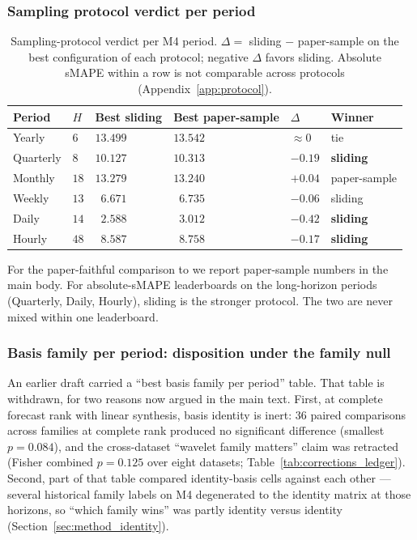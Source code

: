 \subsubsection{Sampling protocol verdict per period}
\label{app:hyperparams:sampling}

\begin{table}[h]
\centering
\small
\caption{Sampling-protocol verdict per M4 period. $\Delta =$ sliding
$-$ paper-sample on the best configuration of each protocol; negative
$\Delta$ favors sliding. Absolute sMAPE within a row is not comparable
across protocols (Appendix~\ref{app:protocol}).}
\label{tab:protocol_per_period}
\begin{tabular}{@{}llllll@{}}
\toprule
Period & $H$ & Best sliding & Best paper-sample & $\Delta$ & Winner \\
\midrule
Yearly    & $6$  & $13.499$ & $13.542$ & $\approx 0$ & tie \\
Quarterly & $8$  & $10.127$ & $10.313$ & $-0.19$ & \textbf{sliding} \\
Monthly   & $18$ & $13.279$ & $13.240$ & $+0.04$ & paper-sample \\
Weekly    & $13$ & $\phantom{0}6.671$ & $\phantom{0}6.735$ & $-0.06$ & sliding \\
Daily     & $14$ & $\phantom{0}2.588$ & $\phantom{0}3.012$ & $\mathbf{-0.42}$ & \textbf{sliding} \\
Hourly    & $48$ & $\phantom{0}8.587$ & $\phantom{0}8.758$ & $-0.17$ & \textbf{sliding} \\
\bottomrule
\end{tabular}
\end{table}

For the paper-faithful comparison to \citet{oreshkin2020nbeats} we report
paper-sample numbers in the main body. For absolute-sMAPE leaderboards on
the long-horizon periods (Quarterly, Daily, Hourly), sliding is the
stronger protocol. The two are never mixed within one leaderboard.

\subsubsection{Basis family per period: disposition under the family null}
\label{app:hyperparams:basisfamily}

An earlier draft carried a ``best basis family per period'' table. That
table is withdrawn, for two reasons now argued in the main text. First, at
complete forecast rank with linear synthesis, basis identity is inert:
36 paired comparisons across families at complete rank produced no
significant difference (smallest $p = 0.084$), and the cross-dataset
``wavelet family matters'' claim was retracted (Fisher combined
$p = 0.125$ over eight datasets; Table~\ref{tab:corrections_ledger}).
Second, part of that table compared identity-basis cells against each
other --- several historical family labels on M4 degenerated to the
identity matrix at those horizons, so ``which family wins'' was partly
identity versus identity (Section~\ref{sec:method_identity}).

